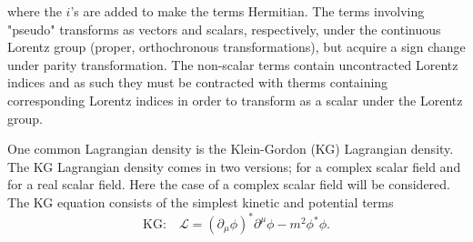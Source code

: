 where the $i$'s are added to make the terms Hermitian. The terms involving "pseudo" transforms as vectors and scalars, respectively, under the continuous Lorentz group (proper, orthochronous transformations), but acquire a sign change under parity transformation. The non-scalar terms contain uncontracted Lorentz indices and as such they must be contracted with therms containing corresponding Lorentz indices in order to transform as a scalar under the Lorentz group. 
\begin{example}
	One common Lagrangian density is the Klein-Gordon (KG) Lagrangian density. The KG Lagrangian density comes in two versions; for a complex scalar field and for a real scalar field. Here the case of a complex scalar field will be considered. The KG equation consists of the simplest kinetic and potential terms
	\begin{equation}
		\text{KG:}\quad \mathcal{L}=(\partial_\mu \phi)^*\partial^\mu\phi-m^2\phi^*\phi.
	\end{equation} 
\end{example}
